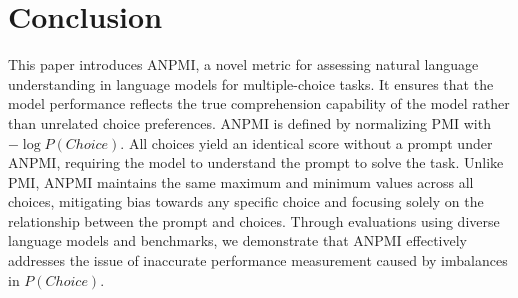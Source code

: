 \section{Conclusion}
This paper introduces ANPMI, a novel metric for assessing natural language understanding in language models for multiple-choice tasks. It ensures that the model performance reflects the true comprehension capability of the model rather than unrelated choice preferences. ANPMI is defined by normalizing PMI with {\small $-\log P(Choice)$}. All choices yield an identical score without a prompt under ANPMI, requiring the model to understand the prompt to solve the task. Unlike PMI, ANPMI maintains the same maximum and minimum values across all choices, mitigating bias towards any specific choice and focusing solely on the relationship between the prompt and choices. Through evaluations using diverse language models and benchmarks, we demonstrate that ANPMI effectively addresses the issue of inaccurate performance measurement caused by imbalances in {\small $P(Choice)$}. 